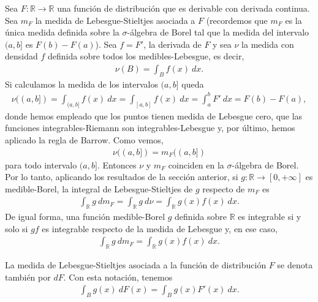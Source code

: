 Sea $F: \mathbb{R} \longrightarrow \mathbb{R}$ una función de distribución que es derivable con derivada continua. Sea $m_F$ la medida de Lebesgue-Stieltjes asociada a $F$ (recordemos que $m_F$ es la única medida definida sobre la $\sigma$-álgebra de Borel tal que la medida del intervalo $(a,b]$ es $F(b) - F(a)$). Sea $f = F'$, la derivada de $F$ y sea $\nu$ la medida con densidad $f$ definida sobre todos los medibles-Lebesgue, es decir,
\begin{align*}
    \nu(B) = \int_{B}{f(x) \ dx}.
\end{align*}
Si calculamos la medida de los intervalos $(a,b]$ queda
\begin{align*}
    \nu((a,b]) = \int_{(a,b]}{f(x) \ dx} = \int_{[a,b]}{f(x) \ dx} = \int_{a}^{b}{F' \ dx} = F(b) - F(a),
\end{align*}
donde hemos empleado que los puntos tienen medida de Lebesgue cero, que las funciones integrables-Riemann son integrables-Lebesgue y, por último, hemos aplicado la regla de Barrow. Como vemos,
\begin{align*}
    \nu((a,b]) = m_F((a,b])
\end{align*}
para todo intervalo $(a,b]$. Entonces $\nu$ y $m_F$ coinciden en la $\sigma$-álgebra de Borel. Por lo tanto, aplicando los resultados de la sección anterior, si $g: \mathbb{R} \longrightarrow [0,+\infty]$ es medible-Borel, la integral de Lebesgue-Stieltjes de $g$ respecto de $m_F$ es
\begin{align*}
    \int_{\mathbb{R}}{g \ dm_F} = \int_{\mathbb{R}}{g \ d\nu} = \int_{\mathbb{R}}{g(x)f(x) \ dx}.
\end{align*}
De igual forma, una función medible-Borel $g$ definida sobre $\mathbb{R}$ es integrable si y solo si $gf$ es integrable respecto de la medida de Lebesgue y, en ese caso,
\begin{align*}
    \int_{\mathbb{R}}{g \ dm_F} = \int_{\mathbb{R}}{g(x)f(x) \ dx}.
\end{align*}

La medida de Lebesgue-Stieltjes asociada a la función de distribución $F$ se denota también por $dF$. Con esta notación, tenemos
\begin{align*}
    \int_{B}{g(x) \ dF(x)} = \int_{B}{g(x)F'(x) \ dx}.
\end{align*}

